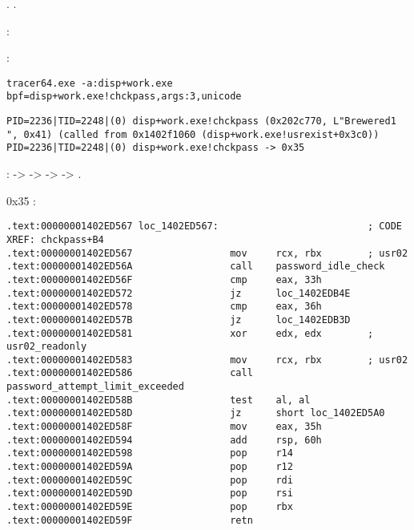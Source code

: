%
.
.

%
:

 \tracer:

\begin{lstlisting}
tracer64.exe -a:disp+work.exe bpf=disp+work.exe!chckpass,args:3,unicode
\end{lstlisting}

\begin{lstlisting}
PID=2236|TID=2248|(0) disp+work.exe!chckpass (0x202c770, L"Brewered1                               ", 0x41) (called from 0x1402f1060 (disp+work.exe!usrexist+0x3c0))
PID=2236|TID=2248|(0) disp+work.exe!chckpass -> 0x35
\end{lstlisting}

:  ->  ->  ->  -> .

 0x35   :

\begin{lstlisting}
.text:00000001402ED567 loc_1402ED567:                          ; CODE XREF: chckpass+B4
.text:00000001402ED567                 mov     rcx, rbx        ; usr02
.text:00000001402ED56A                 call    password_idle_check
.text:00000001402ED56F                 cmp     eax, 33h
.text:00000001402ED572                 jz      loc_1402EDB4E
.text:00000001402ED578                 cmp     eax, 36h
.text:00000001402ED57B                 jz      loc_1402EDB3D
.text:00000001402ED581                 xor     edx, edx        ; usr02_readonly
.text:00000001402ED583                 mov     rcx, rbx        ; usr02
.text:00000001402ED586                 call    password_attempt_limit_exceeded
.text:00000001402ED58B                 test    al, al
.text:00000001402ED58D                 jz      short loc_1402ED5A0
.text:00000001402ED58F                 mov     eax, 35h
.text:00000001402ED594                 add     rsp, 60h
.text:00000001402ED598                 pop     r14
.text:00000001402ED59A                 pop     r12
.text:00000001402ED59C                 pop     rdi
.text:00000001402ED59D                 pop     rsi
.text:00000001402ED59E                 pop     rbx
.text:00000001402ED59F                 retn
\end{lstlisting}

